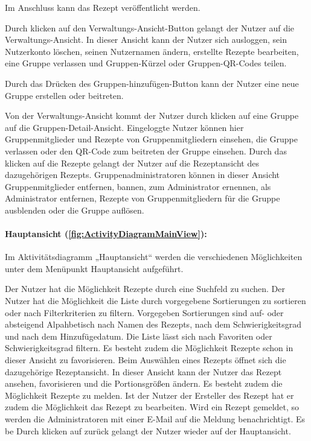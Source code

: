 \documentclass[parskip=full]{scrartcl}
\begin{document}
Im Anschluss kann das Rezept veröffentlicht werden.\par
Durch klicken auf den Verwaltungs-Ansicht-Button
gelangt der Nutzer auf die Verwaltungs-Ansicht.
In dieser Ansicht kann der Nutzer sich ausloggen, sein Nutzerkonto löschen, seinen Nutzernamen ändern,
erstellte Rezepte bearbeiten, eine Gruppe verlassen und Gruppen-Kürzel oder Gruppen-QR-Codes teilen.\par
Durch das Drücken des Gruppen-hinzufügen-Button kann der Nutzer eine neue Gruppe erstellen oder beitreten.

Von der Verwaltungs-Ansicht kommt der Nutzer durch klicken auf eine Gruppe auf die Gruppen-Detail-Ansicht.
Eingeloggte Nutzer können hier Gruppenmitglieder und Rezepte von Gruppenmitgliedern einsehen, die Gruppe verlassen oder den QR-Code zum beitreten der Gruppe einsehen.
Durch das klicken auf die Rezepte gelangt der Nutzer auf die Rezeptansicht des dazugehörigen Rezepts.
Gruppenadministratoren können in dieser Ansicht Gruppenmitglieder entfernen, bannen, zum Administrator ernennen, als Administrator entfernen, Rezepte von Gruppenmitgliedern für die Gruppe ausblenden oder die Gruppe auflösen.\par



\paragraph{Hauptansicht (\autoref{fig:ActivityDiagramMainView}):}

Im Aktivitätsdiagramm „Hauptansicht“
werden die verschiedenen Möglichkeiten unter dem Menüpunkt Hauptansicht aufgeführt.


Der Nutzer hat die Möglichkeit Rezepte durch eine Suchfeld zu suchen.
Der Nutzer hat die Möglichkeit die Liste durch vorgegebene Sortierungen zu sortieren oder nach Filterkriterien zu filtern.
Vorgegeben Sortierungen sind auf- oder absteigend Alpahbetisch nach Namen des Rezepts, nach dem Schwierigkeitsgrad und nach dem Hinzufügedatum.
Die Liste lässt sich nach Favoriten oder Schwierigkeitsgrad filtern.
Es besteht zudem die Möglichkeit Rezepte schon in dieser Ansicht zu favorisieren.\newline
Beim Auswählen eines Rezepts öffnet sich die dazugehörige Rezeptansicht.
In dieser Ansicht kann der Nutzer das Rezept ansehen, favorisieren und die Portionsgrößen ändern.
Es besteht zudem die Möglichkeit Rezepte zu melden.
Ist der Nutzer der Ersteller des Rezept hat er zudem die Möglichkeit das Rezept zu bearbeiten.
Wird ein Rezept gemeldet, so werden die Administratoren mit einer E-Mail auf die Meldung benachrichtigt.\newline
Es be
Durch klicken auf zurück gelangt der Nutzer wieder auf der Hauptansicht.\par
\end{document}
